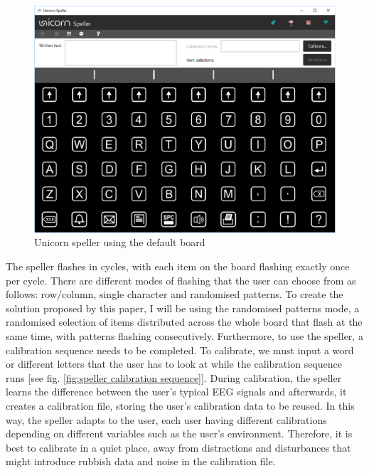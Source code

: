 \begin{figure}[H]
  \centering
  \includegraphics[width=1\textwidth]{Graphics/Speller.png}
  \caption{Unicorn speller using the default board}
  \label{fig:speller default board}
\end{figure}

The speller flashes in cycles, with each item on the board flashing exactly once per cycle. There are different modes of flashing that the user can choose from as follows: row/column, single character and randomised patterns. To create the solution proposed by this paper, I will be using the randomised patterns mode, a randomised selection of items distributed across the whole board that flash at the same time, with patterns flashing consecutively\cite{UnicornSuite_Manual}. 
\vspace{\baselineskip}\newline
Furthermore, to use the speller, a calibration sequence needs to be completed. To calibrate, we must input a word or different letters that the user has to look at while the calibration sequence runs [see fig. \ref{fig:speller calibration sequence}]. During calibration, the speller learns the difference between the user's typical EEG signals and afterwards, it creates a calibration file, storing the user's calibration data to be reused. In this way, the speller adapts to the user, each user having different calibrations depending on different variables such as the user's environment. Therefore, it is best to calibrate in a quiet place, away from distractions and disturbances that might introduce rubbish data and noise in the calibration file.

